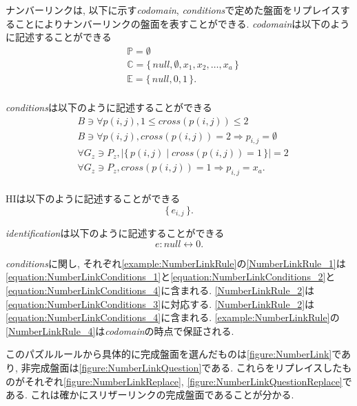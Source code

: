 \begin{example}[ナンバーリンクの数学的記述]
  ナンバーリンクは, 以下に示す\textit{codomain}, \textit{conditions}で定めた盤面をリプレイスすることによりナンバーリンクの盤面を表すことができる.
  \textit{codomain}は以下のように記述することができる
  \begin{align}
     & \mathbb{P}=\emptyset                                             \\
     & \mathbb{C}=\{\,\textit{null}, \emptyset ,x_1,x_2,\ldots, x_a\,\} \\
     & \mathbb{E}=\{\,\textit{null},0,1\,\}          .                  \\
  \end{align}

  \textit{conditions}は以下のように記述することができる
  \begin{align}
     & B\ni \forall p(i,j),1\le \textit{cross}(p(i,j))\le 2                          \label{equation:NumberLinkConditions_1} \\
     & B\ni \forall p(i,j), \textit{cross}(p(i,j))= 2 \Rightarrow p_{i,j}=\emptyset \label{equation:NumberLinkConditions_2}  \\
     & \forall G_z\ni P_z, |\{\,p(i,j)\mid cross(p(i,j))=1\,\}|=2             \label{equation:NumberLinkConditions_3}        \\
     & \forall G_z\ni P_z, \textit{cross}(p(i,j))= 1 \Rightarrow p_{i,j}=x_a     \label{equation:NumberLinkConditions_4} .   \\
  \end{align}

  HIは以下のように記述することができる
  \begin{equation}
    \{\,e_{i,j}\,\}.
  \end{equation}

  \textit{identification}は以下のように記述することができる
  \begin{equation}
    e:\textit{null}\leftrightarrow 0.
  \end{equation}

  \textit{conditions}に関し, それぞれ\cref{example:NumberLinkRule}の\ref{NumberLinkRule_1}は\cref{equation:NumberLinkConditions_1}と\cref{equation:NumberLinkConditions_2}と\cref{equation:NumberLinkConditions_4}に含まれる. \ref{NumberLinkRule_2}は\cref{equation:NumberLinkConditions_3}に対応する. \ref{NumberLinkRule_2}は\cref{equation:NumberLinkConditions_4}に含まれる. \cref{example:NumberLinkRule}の\ref{NumberLinkRule_4}は\textit{codomain}の時点で保証される.

  このパズルルールから具体的に完成盤面を選んだものは\cref{figure:NumberLink}であり, 非完成盤面は\cref{figure:NumberLinkQuestion}である. これらをリプレイスしたものがそれぞれ\cref{figure:NumberLinkReplace}, \cref{figure:NumberLinkQuestionReplace}である. これは確かにスリザーリンクの完成盤面であることが分かる.
\end{example}

